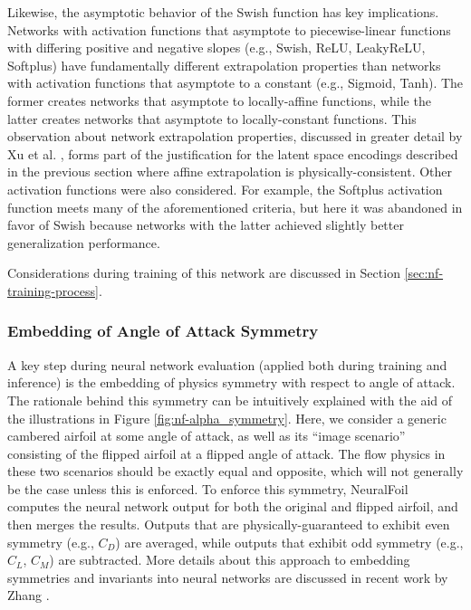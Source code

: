     Likewise, the asymptotic behavior of the Swish function has key implications. Networks with activation functions that asymptote to piecewise-linear functions with differing positive and negative slopes (e.g., Swish, ReLU, LeakyReLU, Softplus) have fundamentally different extrapolation properties than networks with activation functions that asymptote to a constant (e.g., Sigmoid, Tanh). The former creates networks that asymptote to locally-affine functions, while the latter creates networks that asymptote to locally-constant functions. This observation about network extrapolation properties, discussed in greater detail by Xu et al. \cite{xu_how_2021}, forms part of the justification for the latent space encodings described in the previous section where affine extrapolation is physically-consistent. Other activation functions were also considered. For example, the Softplus activation function meets many of the aforementioned criteria, but here it was abandoned in favor of Swish because networks with the latter achieved slightly better generalization performance.

    Considerations during training of this network are discussed in Section \ref{sec:nf-training-process}.

    \subsubsection{Embedding of Angle of Attack Symmetry}

    A key step during neural network evaluation (applied both during training and inference) is the embedding of physics symmetry with respect to angle of attack. The rationale behind this symmetry can be intuitively explained with the aid of the illustrations in Figure \ref{fig:nf-alpha_symmetry}. Here, we consider a generic cambered airfoil at some angle of attack, as well as its ``image scenario'' consisting of the flipped airfoil at a flipped angle of attack. The flow physics in these two scenarios should be exactly equal and opposite, which will not generally be the case unless this is enforced. To enforce this symmetry, NeuralFoil computes the neural network output for both the original and flipped airfoil, and then merges the results. Outputs that are physically-guaranteed to exhibit even symmetry (e.g., $C_D$) are averaged, while outputs that exhibit odd symmetry (e.g., $C_L$, $C_M$) are subtracted. More details about this approach to embedding symmetries and invariants into neural networks are discussed in recent work by Zhang \cite{zhang_threedimensional_2022}.


